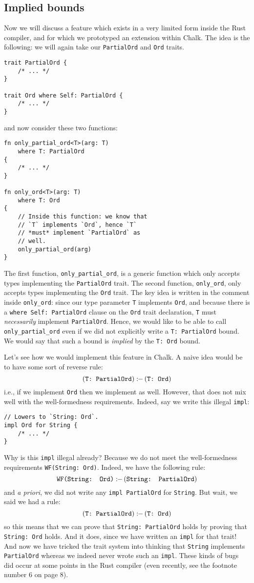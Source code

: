 \documentclass[twocolumn]{article}
\newcommand{\rust}[1]{\texttt{#1}}
\newcommand{\mrust}[1]{\text{\rust{#1}}}
\newcommand{\pif}[0]{:\!\!-\,}
\begin{document}
\subsection{Implied bounds}
Now we will discuss a feature which exists in a very limited form inside the Rust compiler, and for which we prototyped an extension within Chalk. The idea is the following: we will again take our \rust{PartialOrd} and \rust{Ord} traits.
\begin{verbatim}
trait PartialOrd {
    /* ... */
}

trait Ord where Self: PartialOrd {
    /* ... */
}
\end{verbatim}
and now consider these two functions:
\begin{verbatim}
fn only_partial_ord<T>(arg: T)
    where T: PartialOrd
{
    /* ... */
}

fn only_ord<T>(arg: T)
    where T: Ord
{
    // Inside this function: we know that
    // `T` implements `Ord`, hence `T`
    // *must* implement `PartialOrd` as
    // well.
    only_partial_ord(arg)
}
\end{verbatim}
The first function, \rust{only_partial_ord}, is a generic function which only accepts types implementing the \rust{PartialOrd} trait. The second function, \rust{only_ord}, only accepts types implementing the \rust{Ord} trait. The key idea is written in the comment inside \rust{only_ord}: since our type parameter \rust{T} implements \rust{Ord}, and because there is a \rust{where Self: PartialOrd} clause on the \rust{Ord} trait declaration, \rust{T} must \textit{necessarily} implement \rust{PartialOrd}. Hence, we would like to be able to call \rust{only_partial_ord} even if we did not explicitly write a \rust{T: PartialOrd} bound. We would say that such a bound is \textit{implied} by the \rust{T: Ord} bound.

Let's see how we would implement this feature in Chalk. A naive idea would be to have some sort of reverse rule:
\[
    (\mrust{T: PartialOrd}) \pif (\mrust{T: Ord})
\]
i.e., if we implement \rust{Ord} then we implement \mrust{PartialOrd} as well. However, that does not mix well with the well-formedness requirements. Indeed, say we write this illegal \rust{impl}:
\begin{verbatim}
// Lowers to `String: Ord`.
impl Ord for String {
    /* ... */
}
\end{verbatim}
Why is this \rust{impl} illegal already? Because we do not meet the well-formedness requirements \rust{WF(String: Ord)}. Indeed, we have the following rule:
\[
    \mrust{WF(String: Ord)} \pif (\mrust{String: PartialOrd})
\]
and \textit{a priori}, we did not write any \rust{impl PartialOrd} for \rust{String}. But wait, we said we had a rule:
\[
    (\mrust{T: PartialOrd}) \pif (\mrust{T: Ord})
\]
so this means that we can prove that \rust{String: PartialOrd} holds by proving that \rust{String: Ord} holds. And it does, since we have written an \rust{impl} for that trait! And now we have tricked the trait system into thinking that \rust{String} implements \rust{PartialOrd} whereas we indeed never wrote such an \rust{impl}. These kinds of bugs did occur at some points in the Rust compiler (even recently, see the footnote number 6 on page 8).
\end{document}
